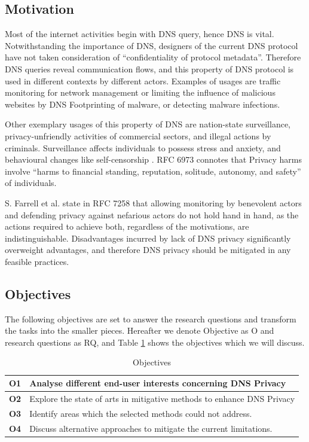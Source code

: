 \documentclass[a4paper,12pt]{article}
\begin{document}
\subsection{Motivation}
Most of the internet activities begin with DNS query, hence DNS is vital. Notwithstanding the importance of DNS, designers of the current DNS protocol have not taken consideration of ``confidentiality of protocol metadata''. Therefore DNS queries reveal communication flows, and this property of DNS protocol is used in different contexts by different actors. Examples of usages are traffic monitoring for network management or limiting the influence of malicious websites by DNS Footprinting of malware\cite{stoner2010dns}, or detecting malware infections\cite{lemos2013got}.

Other exemplary usages of this property of DNS are nation-state surveillance, privacy-unfriendly activities of commercial sectors\cite{weaver2011redirecting}, and illegal actions by criminals. Surveillance affects individuals to possess stress and anxiety\cite{oulasvirta2012long}, and behavioural changes like self-censorship \cite{rfc6973}. RFC 6973 connotes that Privacy harms involve ``harms to financial standing, reputation, solitude, autonomy, and safety\cite{rfc6973}'' of individuals.

S. Farrell et al. state in RFC 7258 that allowing monitoring by benevolent actors and defending privacy against nefarious actors do not hold hand in hand, as the actions required to achieve both, regardless of the motivations, are indistinguishable\cite{rfc7258}.
Disadvantages incurred by lack of DNS privacy significantly overweight advantages, and therefore DNS privacy should be mitigated in any feasible practices.

\subsection{Objectives}
The following objectives are set to answer the research questions and transform the tasks into the smaller pieces. Hereafter we denote Objective as O and research questions as RQ, and Table \ref{objectives} shows the objectives which we will discuss.
\begin{table}[h!]
    \begin{tabular} {|p{1.2cm}|p{12.8cm}|} \hline
        \textbf{O1} & Analyse different end-user interests concerning DNS Privacy\\ \hline
        \textbf{O2} & Explore the state of arts in mitigative methods to enhance DNS Privacy \\ \hline
        \textbf{O3} & Identify areas which the selected methods could not address. \\ \hline
        \textbf{O4} & Discuss alternative approaches to mitigate the current limitations.\\ \hline
    \end{tabular}
    \caption{Objectives}
    \label{objectives}
\end{table}
\end{document}
